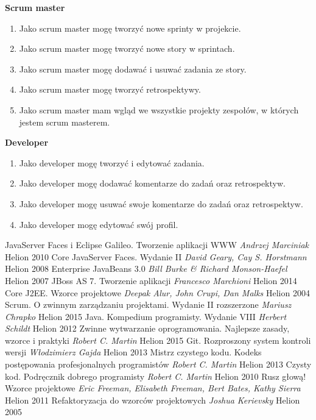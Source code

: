 \documentclass[a4paper,11pt]{article}
\begin{document}
	\textbf{Scrum master}
	\begin{enumerate}		
		\item Jako scrum master mogę tworzyć nowe sprinty w projekcie.
		\item Jako scrum master mogę tworzyć nowe story w sprintach.
		\item Jako scrum master mogę dodawać i usuwać zadania ze story.
		\item Jako scrum master mogę tworzyć retrospektywy.
		\item Jako scrum master mam wgląd we wszystkie projekty zespołów, w których jestem scrum masterem.
	\end{enumerate}
	\textbf{Developer}
	\begin{enumerate}		
		\item Jako developer mogę tworzyć i edytować zadania.
		\item Jako developer mogę dodawać komentarze do zadań oraz retrospektyw.
		\item Jako developer mogę usuwać swoje komentarze do zadań oraz retrospektyw.
		\item Jako developer mogę edytować swój profil.
	\end{enumerate}
	

\newpage
\begin{thebibliography}{99}
	 JavaServer Faces i Eclipse Galileo. Tworzenie aplikacji WWW \emph{Andrzej Marciniak} Helion 2010
	 Core JavaServer Faces. Wydanie II \emph{David Geary, Cay S. Horstmann} Helion 2008
	 Enterprise JavaBeans 3.0 \emph{Bill Burke \& Richard Monson-Haefel} Helion 2007
	 JBoss AS 7. Tworzenie aplikacji \emph{Francesco Marchioni} Helion 2014
	 Core J2EE. Wzorce projektowe \emph{Deepak Alur, John Crupi, Dan Malks} Helion 2004
	 Scrum. O zwinnym zarządzaniu projektami. Wydanie II rozszerzone \emph{Mariusz Chrapko} Helion 2015
	 Java. Kompedium programisty. Wydanie VIII \emph{Herbert Schildt} Helion 2012
	 Zwinne wytwarzanie oprogramowania. Najlepsze zasady, wzorce i praktyki \emph{Robert C. Martin} Helion 2015
	 Git. Rozproszony system kontroli wersji \emph{Włodzimierz Gajda} Helion 2013
	 Mistrz czystego kodu. Kodeks postępowania profesjonalnych programistów \emph{Robert C. Martin} Helion 2013
	 Czysty kod. Podręcznik dobrego programisty \emph{Robert C. Martin} Helion 2010
	 Rusz głową! Wzorce projektowe \emph{Eric Freeman, Elisabeth Freeman, Bert Bates, Kathy Sierra} Helion 2011
	 Refaktoryzacja do wzorców projektowych \emph{Joshua Kerievsky} Helion 2005	
\end{thebibliography}
\end{document}
